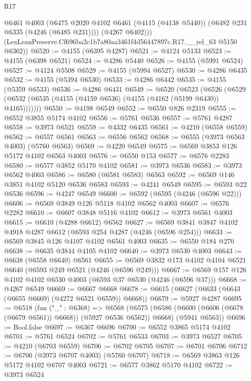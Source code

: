 \begin{lexlean}{R17}
\begin{coremodule}
          @6461
          @4003
          (@6475 @2020 @4102 @6461 (@4115 (@4138 @5440)) (@6482 @231 @6335 (@4246 (@6485 @231))))
          (@4267 @6402)))
      (LexLeanPreserve.Cf696ba2c1b7a80aa3461f4d56447897c.R17.__rel_63 @5150 @6362))
@6520 := @4155 (@6395 @4287)
@6521 := @4124 @5133
@6523 := @4155 (@6398 @6521)
@6524 := @4286 @5440
@6526 := @4155 (@5991 @6524)
@6527 := @4124 @5508
@6529 := @4155 (@5994 @6527)
@6530 := @4286 @6435
@6532 := @4155 (@5394 @6530)
@6533 := @4286 @6442
@6535 := @4155 (@5359 @6533)
@6536 := @4286 @6431
@6549 := @6520
    (@6523
      (@6526 (@6529 (@6532 (@6535 (@4155 (@4159 @6536) (@4155 (@4162 (@5199 @6430)) @4165)))))))
@6550 := @4198 @6549
@6552 := @6550 @826 @2319
@6555 := @6552 @3855 @5174 @4102
@6556 := @5761 @6536
@6557 := @5761 @4287
@6558 := @3973 @6521
@6559 := @4332 @6435
@6561 := @4210 (@6558 @6559)
@6562 := @6557 @6561
@6563 := @6556 @6562
@6568 := @6555 (@3973 @6563 @4003) (@5760 @6563)
@6569 := @4220 @6549
@6575 := @6569 @3853 @126 @5172 @4102 @6563 @4003
@6576 := @6550 @153
@6577 := @6576 @2283
@6580 := @6577 @3852 @5170 @4102
@6581 := @3973 @6536
@6583 := @3973 @6562 @4003
@6586 := @6580 (@6581 @6583) @6563
@6592 := @6569 @146 @3851 @4102 @5120 @6536 @6583
@6593 := @4241 @6549
@6595 := @6593 @22 @6536
@6596 := @4247 @6549
@6600 := @6592 (@6595 (@4246 (@6596 @22)))
@6606 := @6569 @3849 @126 @5118 @4102 @6562 @4003
@6607 := @6576 @2282
@6610 := @6607 @3848 @5116 @4102
@6612 := @3973 @6561 @4003
@6615 := @6610 (@4288 @6612) @6562
@6627 := @6569 @3841 @3847 @4102 @4918 @4287 @6612 (@6593 @254 @4287 (@4246 (@6596 @254)))
@6633 := @6569 @3845 @126 @4107 @4102 @6561 @4003
@6635 := @6550 @184 @270
@6638 := @6635 @3844 @4105 @4102
@6640 := @3973 @6530 @4003
@6643 := @6638 (@6558 @6640) @6561
@6655 := @6569 @3832 @173 @4102 @4104 @6521 @6640 (@6593 @249 @6521 (@4246 (@6596 @249)))
@6667 := @6569 @157 @126 @4102 @4102 @6530 @4003 (@6593 @37 @6530 (@4246 (@6596 @37)))
@6668 := @4267 @6549
@6669 := @6667 @6668
@6678 := @6615 (@6627 (@6633 (@6643 (@6655 @6669) (@4272 @6521 @6559)) @6668))
@6679 := @5927 @4287
@6695 := @6518
    (fun ("_" : @6368) =>
    @6568
      (@6575 (@6586 (@6600 (@6606 (@6678 (@6679 @6561)) @6668)) (@5927 @6536 @6562)) @6668)
      (@5941 @6563))
@6696 := Bool.false
@6697 := @6367 @6696
@6700 := @6552 @3865 @5174 @4102
@6701 := @5761 @6524
@6702 := @5761 @6533
@6703 := @3973 @6527
@6705 := @4210 (@6703 @6559)
@6706 := @6702 @6705
@6707 := @6701 @6706
@6712 := @6700 (@3973 @6707 @4003) (@5760 @6707)
@6718 := @6569 @3863 @126 @5172 @4102 @6707 @4003
@6721 := @6577 @3862 @5170 @4102
@6722 := @3973 @6524

\end{coremodule}
\end{lexlean}
